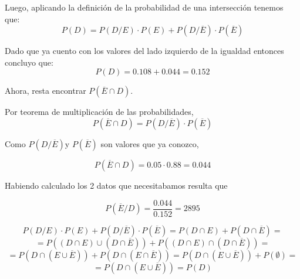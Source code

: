 \documentclass[11pt]{article}
\begin{document}
Luego, aplicando la definici\'on de la probabilidad de una intersecci\'on tenemos que: 
\[P(D) = P(D/E)\cdot P(E) + P(D/\overline{E}) \cdot P(\overline{E})\]

Dado que ya cuento con los valores del lado izquierdo de la igualdad entonces concluyo que: 
\[P(D) = 0.108 + 0.044 = 0.152\]

Ahora, resta encontrar $P(\overline{E}\cap D)$. 

Por teorema de multiplicaci\'on de las probabilidades, 
\[P(\overline{E}\cap D) = P(D/\overline{E})\cdot P(\overline{E})\]

Como $P(D/\overline{E})$y $P(\overline{E})$ son valores que ya conozco, 

\[P(\overline{E}\cap D) = 0.05 \cdot 0.88 = 0.044\] 

Habiendo calculado los 2 datos que necesitabamos resulta que 

\[P(\overline{E}/D) = \frac{0.044}{0.152} = 2895\]


$$P(D/E) \cdot P(E) + P(D/\overline{E}) \cdot P(\overline{E}) = P(D \cap E) + P(D \cap \overline{E}) = $$
$$ = P((D \cap E) \cup (D \cap \overline{E})) + P((D \cap E) \cap (D \cap \overline{E})) = $$
$$ = P(D \cap (E \cup \overline{E})) + P(D \cap (E \cap \overline{E})) = P(D \cap (E \cup \overline{E})) + P(\emptyset) = $$
$$ = P(D \cap (E \cup \overline{E})) = P(D) $$
\end{document}
